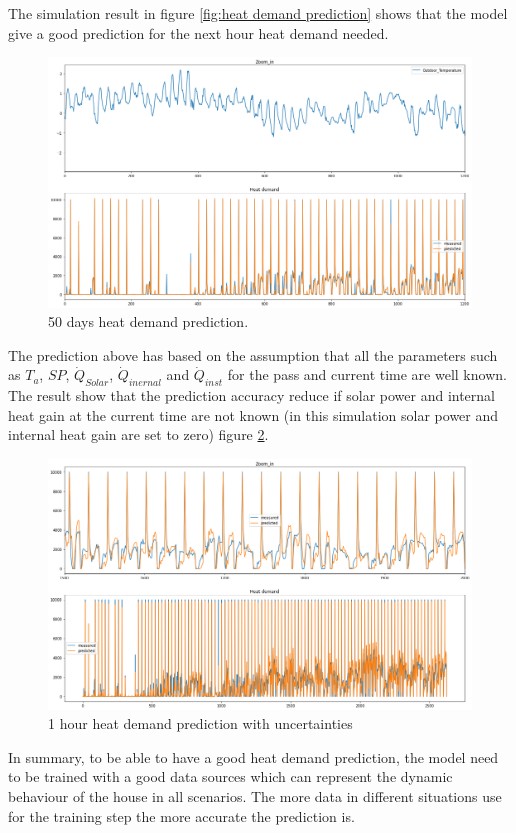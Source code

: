 The simulation result in figure \ref{fig:heat demand prediction} shows that the model give a good prediction for the next hour heat demand needed.

\begin{figure}[H]
	\centering
	\includegraphics[width=1.0\columnwidth]{Pictures/50days_heat_demand_prediction.png}
	\caption[Short title]{50 days heat demand prediction.}
	\label{fig:50 days heat demand prediction}
	\end{figure}


The prediction above has based on the assumption that all the parameters such as $T_{a}$, $SP$, $\dot{Q}_{Solar}$, $\dot{Q}_{inernal}$ and $\dot{Q}_{inst}$ for the pass and current time are well known. The result show that the prediction accuracy reduce if solar power and internal heat gain at the current time are not known (in this simulation solar power and internal heat gain are set to zero) figure \ref{fig:hour prediction with uncertainties}.

\begin{figure}[H]
	\centering
	\includegraphics[width=1.0\columnwidth]{Pictures/1hour_heatdemand_with_uncertainties.png}
	\caption[Short title]{1 hour heat demand prediction with uncertainties}
	\label{fig:hour prediction with uncertainties}
	\end{figure}
	
In summary, to be able to have a good heat demand prediction, the model need to be trained with a good data sources which can represent the dynamic behaviour of the house in all scenarios. The more data in different situations use for the training step the more accurate the prediction is.   

\newpage